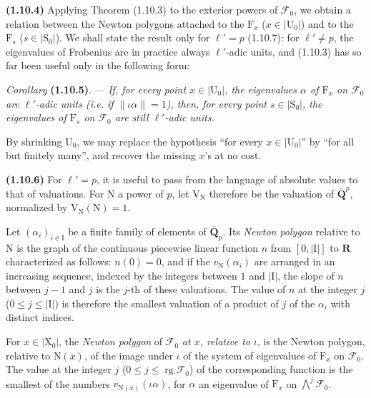 \documentclass[11pt,leqno]{article}
\begin{document}
\textbf{(1.10.4)} Applying Theorem (1.10.3) to the exterior powers of \(\mathscr{F}_0\), we obtain a relation between the Newton polygons attached to the \(\mathrm{F}_x\) (\(x\in\lvert\mathrm{U}_0\rvert\)) and to the \(\mathrm{F}_s\) (\(s\in\lvert\mathrm{S}_0\rvert\)). We shall state the result only for \(\ell'=p\) (1.10.7): for \(\ell'\neq p\), the eigenvalues of Frobenius are in practice always \(\ell'\)-adic units, and (1.10.3) has so far been useful only in the following form:

\textit{Corollary} \textbf{(1.10.5)}. — \textit{If, for every point \(x\in\lvert\mathrm{U}_0\rvert\), the eigenvalues \(\alpha\) of \(\mathrm{F}_x\) on \(\mathscr{F}_0\) are \(\ell'\)-adic units (\textup{i.e.} if \(\lVert\iota\alpha\rVert=1\)), then, for every point \(s\in\lvert\mathrm{S}_0\rvert\), the eigenvalues of \(\mathrm{F}_s\) on \(\mathscr{F}_0\) are still \(\ell'\)-adic units.}

By shrinking \(\mathrm{U}_0\), we may replace the hypothesis “for every \(x\in\lvert\mathrm{U}_0\rvert\)” by “for all but finitely many”, and recover the missing \(x\)'s at no cost.

\textbf{(1.10.6)} For \(\ell'=p\), it is useful to pass from the language of absolute values to that of valuations. For \(\mathrm{N}\) a power of \(p\), let \(\mathrm{V}_{\mathrm{N}}\) therefore be the valuation of \(\overline{\mathbf{Q}}^{p}\), normalized by \(\mathrm{V}_{\mathrm{N}}(\mathrm{N})=1\).

Let \((\alpha_i)_{i\in\mathrm{I}}\) be a finite family of elements of \(\overline{\mathbf{Q}}_p\). Its \textit{Newton polygon} relative to \(\mathrm{N}\) is the graph of the continuous piecewise linear function \(n\) from \([0,\lvert\mathrm{I}\rvert]\) to \(\mathbf{R}\) characterized as follows: \(n(0)=0\), and if the \(v_{\mathrm{N}}(\alpha_i)\) are arranged in an increasing sequence, indexed by the integers between \(1\) and \(\lvert\mathrm{I}\rvert\), the slope of \(n\) between \(j-1\) and \(j\) is the \(j\)-th of these valuations. The value of \(n\) at the integer \(j\) (\(0\leq j\leq\lvert\mathrm{I}\rvert\)) is therefore the smallest valuation of a product of \(j\) of the \(\alpha_i\) with distinct indices.

For \(x\in\lvert\mathrm{X}_0\rvert\), the \textit{Newton polygon} of \(\mathscr{F}_0\) \textit{at \(x\), relative to \(\iota\)}, is the Newton polygon, relative to \(\mathrm{N}(x)\), of the image under \(\iota\) of the system of eigenvalues of \(\mathrm{F}_x\) on \(\mathscr{F}_0\). The value at the integer \(j\) (\(0\leq j\leq\operatorname{rg}\mathscr{F}_0\)) of the corresponding function is the smallest of the numbers \(v_{\mathrm{N}(x)}(\iota\alpha)\), for \(\alpha\) an eigenvalue of \(\mathrm{F}_x\) on \(\bigwedge\limits^{j}\mathscr{F}_0\).
\end{document}
